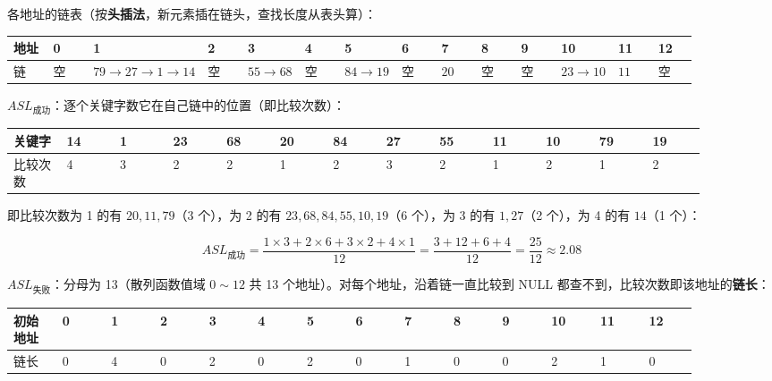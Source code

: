 \documentclass[11pt,openany,UTF8]{ctexbook}
\begin{document}
各地址的链表（按\textbf{头插法}，新元素插在链头，查找长度从表头算）：

\begingroup\footnotesize\setlength{\tabcolsep}{1.5pt}
\begin{longtable}{@{}L{0.0636\linewidth}L{0.0636\linewidth}L{0.0636\linewidth}L{0.0636\linewidth}L{0.0636\linewidth}L{0.0636\linewidth}L{0.0636\linewidth}L{0.0636\linewidth}L{0.0636\linewidth}L{0.0636\linewidth}L{0.0636\linewidth}L{0.0636\linewidth}L{0.0636\linewidth}L{0.0636\linewidth}@{}}
\toprule
\textbf{地址} & \textbf{0} & \textbf{1} & \textbf{2} & \textbf{3} & \textbf{4} & \textbf{5} & \textbf{6} & \textbf{7} & \textbf{8} & \textbf{9} & \textbf{10} & \textbf{11} & \textbf{12} \\
\midrule
\endhead
链 & 空 & $79\to27\to1\to14$ & 空 & $55\to68$ & 空 & $84\to19$ & 空 & $20$ & 空 & 空 & $23\to10$ & $11$ & 空 \\
\bottomrule
\end{longtable}
\endgroup

\textbf{$ASL_{成功}$}：逐个关键字数它在自己链中的位置（即比较次数）：

\begingroup\footnotesize\setlength{\tabcolsep}{1.5pt}
\begin{longtable}{@{}L{0.0689\linewidth}L{0.0689\linewidth}L{0.0689\linewidth}L{0.0689\linewidth}L{0.0689\linewidth}L{0.0689\linewidth}L{0.0689\linewidth}L{0.0689\linewidth}L{0.0689\linewidth}L{0.0689\linewidth}L{0.0689\linewidth}L{0.0689\linewidth}L{0.0689\linewidth}@{}}
\toprule
\textbf{关键字} & \textbf{14} & \textbf{1} & \textbf{23} & \textbf{68} & \textbf{20} & \textbf{84} & \textbf{27} & \textbf{55} & \textbf{11} & \textbf{10} & \textbf{79} & \textbf{19} \\
\midrule
\endhead
比较次数 & 4 & 3 & 2 & 2 & 1 & 2 & 3 & 2 & 1 & 2 & 1 & 2 \\
\bottomrule
\end{longtable}
\endgroup

即比较次数为 1 的有 $20,11,79$（3 个），为 2 的有 $23,68,84,55,10,19$（6 个），为 3 的有 $1,27$（2 个），为 4 的有 $14$（1 个）：

\[ASL_{成功}=\frac{1\times 3+2\times 6+3\times 2+4\times 1}{12}=\frac{3+12+6+4}{12}=\frac{25}{12}\approx2.08\]

\textbf{$ASL_{失败}$}：分母为 13（散列函数值域 $0\sim 12$ 共 13 个地址）。对每个地址，沿着链一直比较到 NULL 都查不到，比较次数即该地址的\textbf{链长}：

\begingroup\footnotesize\setlength{\tabcolsep}{1.5pt}
\begin{longtable}{@{}L{0.0636\linewidth}L{0.0636\linewidth}L{0.0636\linewidth}L{0.0636\linewidth}L{0.0636\linewidth}L{0.0636\linewidth}L{0.0636\linewidth}L{0.0636\linewidth}L{0.0636\linewidth}L{0.0636\linewidth}L{0.0636\linewidth}L{0.0636\linewidth}L{0.0636\linewidth}L{0.0636\linewidth}@{}}
\toprule
\textbf{初始地址} & \textbf{0} & \textbf{1} & \textbf{2} & \textbf{3} & \textbf{4} & \textbf{5} & \textbf{6} & \textbf{7} & \textbf{8} & \textbf{9} & \textbf{10} & \textbf{11} & \textbf{12} \\
\midrule
\endhead
链长 & 0 & 4 & 0 & 2 & 0 & 2 & 0 & 1 & 0 & 0 & 2 & 1 & 0 \\
\bottomrule
\end{longtable}
\endgroup
\end{document}
